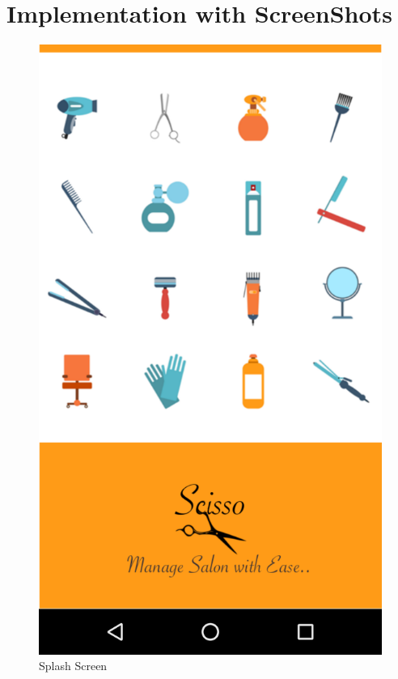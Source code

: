 \section{Implementation with ScreenShots}

\begin{figure}[h]
	\centering
	\includegraphics[width=0.7\linewidth]{SplashYes}
	\caption{Splash Screen}
\end{figure}
\pagebreak

